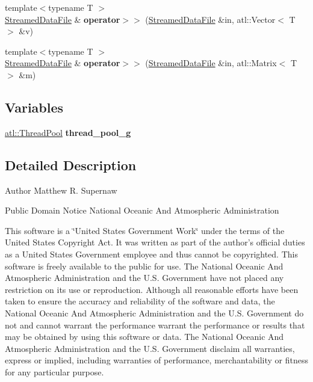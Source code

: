 \begin{DoxyCompactItemize}
\item 
\hypertarget{namespaceatl_aadf5fb10202429c087a8756b0efd95aa}{{\footnotesize template$<$typename T $>$ }\\\hyperlink{classatl_1_1_streamed_data_file}{Streamed\+Data\+File} \& {\bfseries operator$>$$>$} (\hyperlink{classatl_1_1_streamed_data_file}{Streamed\+Data\+File} \&in, atl\+::\+Vector$<$ T $>$ \&v)}\label{namespaceatl_aadf5fb10202429c087a8756b0efd95aa}

\item 
\hypertarget{namespaceatl_a3483a1a2eae72fecc9e859a2d9e180d4}{{\footnotesize template$<$typename T $>$ }\\\hyperlink{classatl_1_1_streamed_data_file}{Streamed\+Data\+File} \& {\bfseries operator$>$$>$} (\hyperlink{classatl_1_1_streamed_data_file}{Streamed\+Data\+File} \&in, atl\+::\+Matrix$<$ T $>$ \&m)}\label{namespaceatl_a3483a1a2eae72fecc9e859a2d9e180d4}

\end{DoxyCompactItemize}
\subsection*{Variables}
\begin{DoxyCompactItemize}
\item 
\hypertarget{namespaceatl_af67f06c8d6e3a8bf2d039e687ed7bd27}{\hyperlink{classatl_1_1_thread_pool}{atl\+::\+Thread\+Pool} {\bfseries thread\+\_\+pool\+\_\+g}}\label{namespaceatl_af67f06c8d6e3a8bf2d039e687ed7bd27}

\end{DoxyCompactItemize}


\subsection{Detailed Description}
\begin{DoxyAuthor}{Author}
Matthew R. Supernaw
\end{DoxyAuthor}
Public Domain Notice National Oceanic And Atmospheric Administration

This software is a \char`\"{}\+United States Government Work\char`\"{} under the terms of the United States Copyright Act. It was written as part of the author's official duties as a United States Government employee and thus cannot be copyrighted. This software is freely available to the public for use. The National Oceanic And Atmospheric Administration and the U.\+S. Government have not placed any restriction on its use or reproduction. Although all reasonable efforts have been taken to ensure the accuracy and reliability of the software and data, the National Oceanic And Atmospheric Administration and the U.\+S. Government do not and cannot warrant the performance warrant the performance or results that may be obtained by using this software or data. The National Oceanic And Atmospheric Administration and the U.\+S. Government disclaim all warranties, express or implied, including warranties of performance, merchantability or fitness for any particular purpose.

